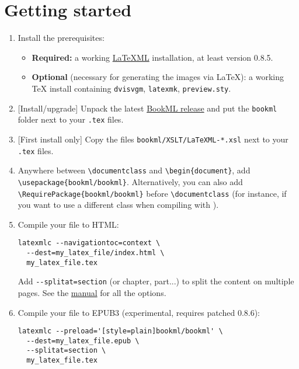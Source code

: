 \documentclass[a4paper,british]{article}
\def\ltxinline{\lstinline[style=bookml]}
\begin{document}
\tableofcontents

\section{Getting started}

\begin{enumerate}
  \item Install the prerequisites:
  \begin{itemize}
    \item \textbf{Required:} a working \href{https://dlmf.nist.gov/LaTeXML/}{LaTeXML} installation, at least version 0.8.5.
    \item \textbf{Optional} (necessary for generating the images via \LaTeX): a working \TeX{} install containing \lstinline|dvisvgm|, \lstinline|latexmk|, \lstinline|preview.sty|.
  \end{itemize}
  \item {}[Install/upgrade] Unpack the latest \href{https://github.com/vlmantova/bookml/releases}{BookML release} and put the \lstinline|bookml| folder next to your \lstinline|.tex| files.
  \item {}[First install only] Copy the files \lstinline|bookml/XSLT/LaTeXML-*.xsl| next to your \lstinline|.tex| files.
  \item \label{edit-tex-file} Anywhere between \ltxinline|\documentclass| and \ltxinline|\begin{document}|, add \ltxinline|\usepackage{bookml/bookml}|. Alternatively, you can also add \ltxinline|\RequirePackage{bookml/bookml}| before \ltxinline|\documentclass| (for instance, if you want to use a different class when compiling with \LaTeXML{}).
  \item Compile your file to HTML:
    \begin{lstlisting}
latexmlc --navigationtoc=context \
  --dest=my_latex_file/index.html \
  my_latex_file.tex
    \end{lstlisting}
    Add \ltxinline|--splitat=section| (or chapter, part...) to split the content on multiple pages. See the \LaTeXML{} \href{https://dlmf.nist.gov/LaTeXML/manual/usage/}{manual} for all the options.
  \item Compile your file to EPUB3 (experimental, requires patched \LaTeXML{} 0.8.6):
    \begin{lstlisting}
latexmlc --preload='[style=plain]bookml/bookml' \
  --dest=my_latex_file.epub \
  --splitat=section \
  my_latex_file.tex
    \end{lstlisting}
\end{enumerate}
\end{document}
